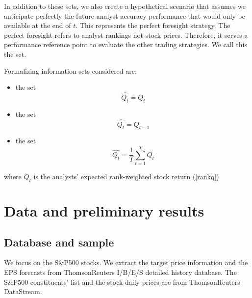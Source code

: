 \documentclass[a4paper,twoside,12pt,openright,notitlepage]{report}\usepackage[]{graphicx}\usepackage[]{color}
\begin{document}
In addition to these sets,  we also create a hypothetical scenario that assumes we anticipate perfectly the future analyst accuracy performance  that would only be available at the end of $t$.  This represents the perfect foresight strategy. The perfect foresight refers to analyst rankings not stock prices. Therefore, it serves a performance reference point to evaluate the other trading strategies. We call this the \tr{} set.

Formalizing information sets considered are:
\begin{itemize}
\item  the \tr{} set%
\begin{equation}
\label{q:true}
\widehat{Q_{t}}=Q_{t}
\end{equation}

\item  the \naive{} set %
\begin{equation}
\label{q:naive}
\widehat{Q_{t}}=Q_{t-1}
\end{equation}

\item  the   set%
\begin{equation}
\label{q:default}
\widehat{Q_{t}} = \frac{1}{T} \sum_{t=1}^{T} Q_{t}
\end{equation}
\end{itemize}
where $Q_{t}$ is the analysts' expected rank-weighted stock return (\ref{rankq})

\section{Data and preliminary results}
\label{ch1-sec:rankings}

\subsection{Database and sample}
We focus on the  S\&P500 stocks. We extract the target price information and the EPS forecasts from ThomsonReuters  I/B/E/S detailed history database. The  S\&P500 constituents' list and the stock daily prices are from ThomsonReuters DataStream.
\end{document}
